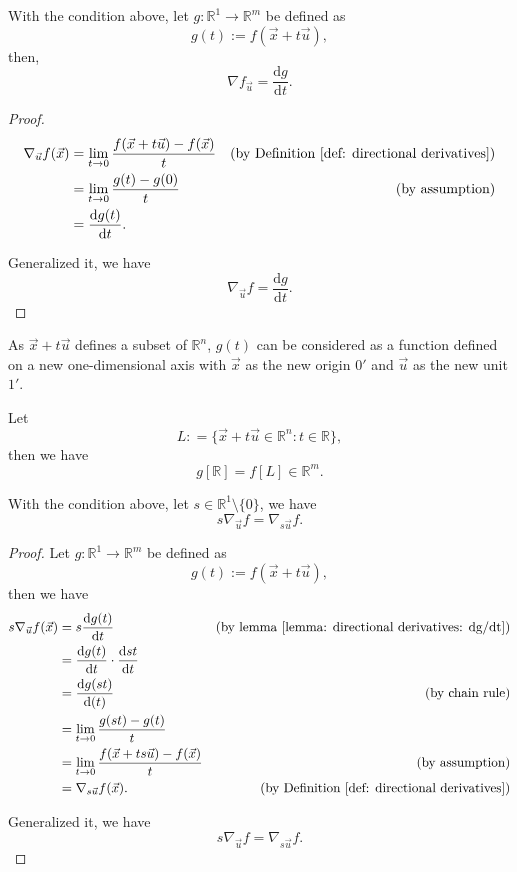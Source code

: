 \begin{lemma}
	\label{lemma: directional derivatives: dg/dt}
	With the condition above, let $g: \mathbb R^1 \to \mathbb R^m$ be defined as
	$$
	g(t) := f(\vec x + t\vec u),
	$$
	then,
	$$
	\nabla f_{\vec u} = \frac{\mathrm d g}{\mathrm d t}.
	$$
	
	\begin{proof}
		$$
		\begin{aligned}
			\nabla_{\vec u} f (\vec x) &= \lim_{t \to 0} \frac{f(\vec x + t \vec u) - f(\vec x)}{t} &\text{(by Definition \ref{def: directional derivatives})} \\
			&= \lim_{t \to 0} \frac{g(t) - g(0)}{t} &\text{(by assumption)} \\
			&= \frac{\mathrm d g(t)}{\mathrm dt}.
		\end{aligned}
		$$
		
		Generalized it, we have
		$$
		\nabla_{\vec u} f = \frac{\mathrm d g}{\mathrm dt}.
		$$
	\end{proof}
\end{lemma}



\begin{note}
	As $\vec x + t\vec u$ defines a subset of $\mathbb R^n$, $g(t)$ can be considered as a function defined on a new one-dimensional axis with $\vec x$ as the new origin $0'$ and $\vec u$ as the new unit $1'$.

	Let
	$$
	L : =  \{ \vec x + t \vec u \in \mathbb R^n : t \in \mathbb R \},
	$$
	then we have
	$$
	g[\mathbb R] = f[L] \in \mathbb R^m.
	$$
\end{note}



\begin{lemma}
	\label{lemma: directional derivatives: su}
	With the condition above, let $s \in \mathbb R^1 \setminus \{0\}$, we have
	$$
	s\nabla_{\vec u} f = \nabla_{s\vec u} f.
	$$
	
	\begin{proof}
		Let $g: \mathbb R^1 \to \mathbb R^m$ be defined as
		$$
		g(t) := f(\vec x + t \vec u),
		$$
		then we have
		$$
		\begin{aligned}
			s \nabla_{\vec u} f(\vec x) &= s \frac{\mathrm d g(t)}{\mathrm d t} &\text{(by lemma \ref{lemma: directional derivatives: dg/dt})} \\
			&= \frac{\mathrm d g(t)}{\mathrm dt} \cdot \frac{\mathrm d st}{\mathrm d t} \\
			&= \frac{\mathrm d g(st)}{\mathrm d(t)} &\text{(by chain rule)} \\
			&= \lim_{t \to 0} \frac{g(st) - g(t)}{t} \\
			&= \lim_{t \to 0} \frac{f(\vec x + t s \vec u) - f(\vec x)}{t} &\text{(by assumption)} \\
			&= \nabla_{s \vec u} f(\vec x). & \text{(by Definition \ref{def: directional derivatives})}
		\end{aligned}
		$$
		
		Generalized it, we have
		$$
		s\nabla_{\vec u} f = \nabla_{s\vec u} f.
		$$
	\end{proof}
\end{lemma}



